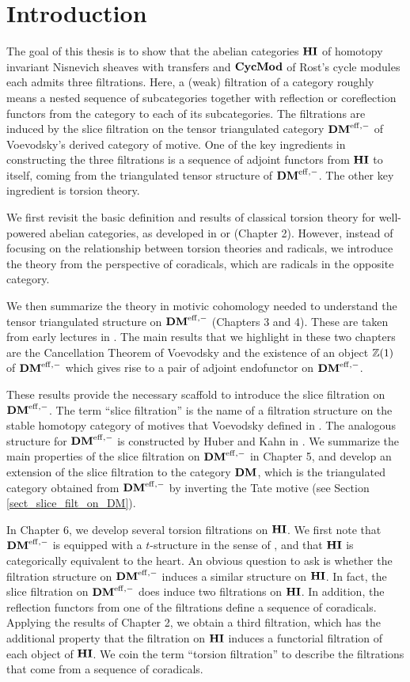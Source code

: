\chapter{Introduction} 

The goal of this thesis is to show that the abelian categories 
$\mathbf{HI}$ of homotopy invariant Nisnevich sheaves with transfers and 
$\mathbf{CycMod}$ of Rost's cycle modules each admits three filtrations. 
Here, a (weak) filtration of a category roughly means a nested sequence of 
subcategories together with reflection or coreflection functors 
from the category to each of its subcategories. The filtrations 
are induced by the slice filtration on the tensor triangulated 
category $\mathbf{DM}^{\mathrm{eff},-}$ of Voevodsky's derived category of motive. One 
of the key ingredients in constructing the three filtrations is a 
sequence of adjoint functors from $\mathbf{HI}$ to itself, coming from the 
triangulated tensor structure of $\mathbf{DM}^{\mathrm{eff},-}$. The other key 
ingredient is torsion theory.
 
We first revisit the basic definition and results of classical 
torsion theory for well-powered abelian categories, as developed 
in \cite{BJV} or \cite{DTor} (Chapter 2). However, instead of focusing
on the relationship between torsion theories and radicals, we
introduce the theory from the perspective of coradicals, which are 
radicals in the opposite category.  

We then summarize the theory in motivic cohomology needed to 
understand the tensor triangulated structure on $\mathbf{DM}^{\mathrm{eff},-}$ 
(Chapters 3 and 4). These are taken from early lectures in 
\cite{MVW}. The main results that we highlight in these two 
chapters are the Cancellation Theorem of Voevodsky and the
existence of an object $\mathbb{Z}(1)$ of $\mathbf{DM}^{\mathrm{eff},-}$ which gives rise to a pair of 
adjoint endofunctor on $\mathbf{DM}^{\mathrm{eff},-}$. 

These results provide the necessary scaffold to introduce the 
slice filtration on $\mathbf{DM}^{\mathrm{eff},-}$. The term ``slice filtration'' is the
name of a filtration structure on the stable homotopy category 
of motives that Voevodsky defined in \cite{VOP}. The analogous
structure for $\mathbf{DM}^{\mathrm{eff},-}$ is constructed by Huber and Kahn in 
\cite{HuKa}. We summarize the main properties of the slice 
filtration on $\mathbf{DM}^{\mathrm{eff},-}$ in Chapter 5, and develop an extension of
the slice filtration to the category $\mathbf{DM}$, which is the
triangulated category obtained from $\mathbf{DM}^{\mathrm{eff},-}$ by inverting the
Tate motive (see Section \ref{sect_slice_filt_on_DM}).

In Chapter 6, we develop several torsion filtrations on
$\mathbf{HI}$. We first note that $\mathbf{DM}^{\mathrm{eff},-}$ is equipped with a 
$t$-structure in the sense of \cite{BBD}, and that $\mathbf{HI}$ is categorically
equivalent to the heart. An obvious question to ask is whether the
filtration structure on $\mathbf{DM}^{\mathrm{eff},-}$ induces a similar structure on
$\mathbf{HI}$. In fact, the slice filtration on $\mathbf{DM}^{\mathrm{eff},-}$ does induce two
filtrations on $\mathbf{HI}$. In addition, the reflection functors from
one of the filtrations define a sequence of coradicals. Applying
the results of Chapter 2, we obtain a third filtration, which has
the additional property that the filtration on $\mathbf{HI}$ induces a 
functorial filtration of each object of $\mathbf{HI}$. We coin the
term ``torsion filtration'' to describe the filtrations that
come from a sequence of coradicals.

